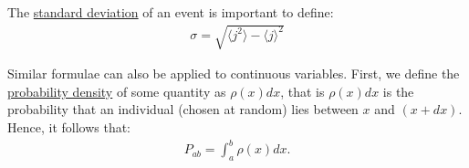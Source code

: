 \documentclass{article}
\begin{document}
    The \underline{standard deviation} of an event is important to define:
    \begin{align*}
        \sigma = \sqrt{\langle j^2 \rangle - \langle j \rangle^2}
    \end{align*}

    Similar formulae can also be applied to continuous variables. First, we 
    define the \underline{probability density} of some quantity as $\rho(x) dx$,
    that is $\rho(x)dx$ is the probability that an individual (chosen at random)
    lies between $x$ and $(x + dx)$. Hence, it follows that:
    \begin{align*}
        P_{ab} = \int_a^b \rho(x) dx.
    \end{align*}
\end{document}
